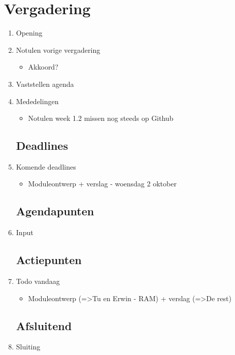 \documentclass{article}
\begin{document}
\section*{Vergadering}
\begin{enumerate}
	
	\subsection*{Vooraf}
	\item Opening
	\item Notulen vorige vergadering
	\begin{itemize}
		\item Akkoord?
	\end{itemize}
	\item Vaststellen agenda
	\item Mededelingen
	\begin{itemize}
		\item Notulen week 1.2 missen nog steeds op Github
	\end{itemize}

	\subsection*{Deadlines}
	\item Komende deadlines
	\begin{itemize}
		\item Moduleontwerp + verslag - woensdag 2 oktober
	\end{itemize}

	\subsection*{Agendapunten}
	\item Input
	

	\subsection*{Actiepunten}
	\item Todo vandaag
	\begin{itemize}
		\item Moduleontwerp (=>Tu en Erwin - RAM) + verslag (=>De rest)
	\end{itemize}

	\noindent 
	\subsection*{Afsluitend}
	\item Sluiting

\end{enumerate}
\end{document}
